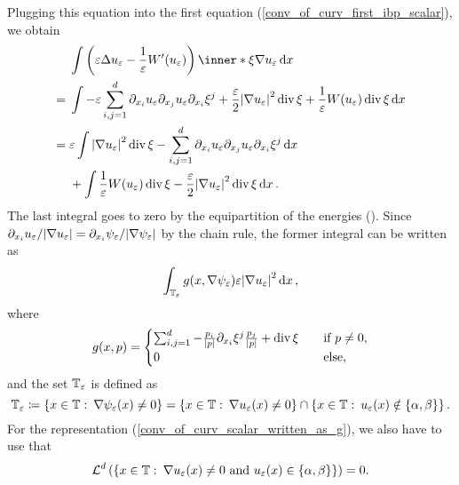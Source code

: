 Plugging this equation into the first equation (\ref{conv_of_curv_first_ibp_scalar}), we obtain
\begin{align*}
	& \int
		\left(
			\varepsilon \Delta u_{ \varepsilon }
			-
			\frac{ 1 }{ \varepsilon }
			W'( u_{ \varepsilon } ) 
		\right)
		\inner*{ \xi }{ \nabla u_{ \varepsilon } }
	\dd{ x }
	\\
	={} &
	\int
		-\varepsilon \sum_{ i, j = 1}^{ d }
			\partial_{ x_{ i } } u_{ \varepsilon }
			\partial_{ x_{ j } } u_{ \varepsilon }
			\partial_{ x_{ i } } \xi^{ j } 
		+
		\frac{ \varepsilon }{ 2 }
		\abs{ \nabla u_{ \varepsilon } }^{ 2 }
		\divg \xi 
		+
		\frac{ 1 }{ \varepsilon }
		W ( u_{ \varepsilon } ) 
		\divg \xi 
	\dd{ x }
	\\
	= {} &
	\varepsilon
	\int
		\abs{ \nabla u_{ \varepsilon } }^{ 2 }
		\divg \xi 
		-
		\sum_{ i, j = 1 }^{ d }
			\partial_{ x_{ i } } u_{ \varepsilon }
			\partial_{ x_{ j } } u_{ \varepsilon }
			\partial_{ x_{ i } } \xi^{ j }
	\dd{ x }
	\\
	& + 
	\int
		\frac{ 1 }{ \varepsilon }
		W ( u_{ \varepsilon } )
		\divg \xi 
		-
		\frac{ \varepsilon }{ 2 }
		\abs{ \nabla u_{ \varepsilon } }^{ 2 }
		\divg \xi
	\dd{ x }.
\end{align*}
The last integral goes to zero by the equipartition of the energies ().
Since $ \partial_{ x_{ i } } u_{ \varepsilon } / \abs{ \nabla u_{ \varepsilon } } = \partial_{ x_{ i } } \psi_{ \varepsilon } / \abs{ \nabla \psi_{ \varepsilon  } } $ by the chain rule, the former integral can be written as
\begin{equation*}
	\label{conv_of_curv_scalar_written_as_g}
	\int_{ \operatorname{\mathbb{T}}_{ \varepsilon } }
		g ( x , \nabla \psi_{ \varepsilon } )
		\varepsilon \abs{ \nabla u_{ \varepsilon } }^{ 2 }
	\dd{ x },
\end{equation*}
where 
\begin{equation*}
	g ( x, p )
	=
	\begin{cases}
		\sum_{ i, j = 1}^{ d }
			-
			\frac{ p_{ i } }{ \abs{ p } }
			\partial_{ x_{ i } } \xi^{ j }
			\frac{ p_{ j } }{ \abs{ p } }
		+
		\operatorname{div} \xi 
		\quad
		&\text{if } p \neq 0,
		\\
		0
		&\text{else},
	\end{cases}
\end{equation*}
and the set $ \operatorname{\mathbb{T}}_{ \varepsilon } $ is defined as
\begin{equation*}
	\operatorname{\mathbb{T}}_{ \varepsilon }
	\coloneqq
	\left\{
		x \in \operatorname{\mathbb{T}}
		\, \colon \,
		\nabla \psi_{ \varepsilon } ( x ) \neq 0
	\right\}
	=
	\left\{
		x \in \operatorname{\mathbb{T}}
		\, \colon \,
		\nabla u_{ \varepsilon } ( x ) \neq 0 
	\right\}
	\cap
	\left\{
		x \in \operatorname{\mathbb{T}}
		\, \colon \,
		u_{ \varepsilon } ( x ) \notin \{ \alpha , \beta \}
	\right\}.
\end{equation*}
For the representation (\ref{conv_of_curv_scalar_written_as_g}), we also have to use that 
\begin{equation*}
	\operatorname{\mathcal{L}}^{ d } \left(
		\left\{
			x \in \operatorname{\mathbb{T}}
			\, \colon \,
			\nabla u_{ \varepsilon } ( x ) \neq 0 \text{ and } u_{ \varepsilon } ( x ) \in \{ \alpha , \beta \}
		\right\}
	\right)
	=
	0.
\end{equation*}

